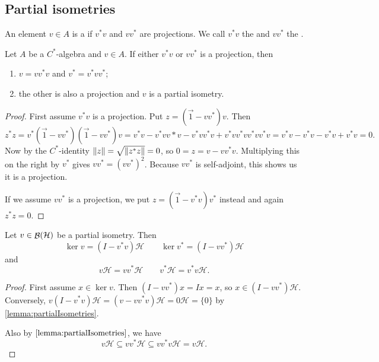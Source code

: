 \subsection{Partial isometries}
\begin{definition}
An element $v\in A$ is a  if $v^*v$ and $vv^*$ are projections. We call $v^*v$ the  and $vv^*$ the .
\end{definition}
\begin{lemma} \label{lemma:partialIsometries}
Let $A$ be a $C^*$-algebra and $v\in A$.
If either $v^*v$ or $vv^*$ is a projection, then
\begin{enumerate}
\item $v=vv^*v$ and $v^* = v^*vv^*$;
\item the other is also a projection and $v$ is a partial isometry.
\end{enumerate}
\end{lemma}
\begin{proof}
First assume $v^*v$ is a projection. Put $z = (\vec{1}- vv^*)v$. Then
\[ z^*z = v^*(\vec{1}-vv^*)(\vec{1}-vv^*)v = v^*v - v^*vv*v -v^*vv^*v + v^*vv^*vv^*vv^*v = v^*v - v^*v - v^*v + v^*v = 0. \]
Now by the $C^*$-identity $\lVert z\rVert = \sqrt{\lVert z^*z\rVert} = 0$, so $0=z= v - vv^*v$. Multiplying this on the right by $v^*$ gives $vv^* = (vv^*)^2$. Because $vv^*$ is self-adjoint, this shows us it is a projection.

If we assume $vv^*$ is a projection, we put $z = (\vec{1}- v^*v)v^*$ instead and again $z^*z = 0$.
\end{proof}

\begin{lemma}
Let $v\in\mathop{\mathcal{B}}(\mathcal{H})$ be a partial isometry. Then
\[\ker v = (I - v^*v)\mathcal{H} \qquad \ker v^* = (I - vv^*)\mathcal{H}\]
and
\[ v\mathcal{H} = vv^*\mathcal{H} \qquad v^*\mathcal{H} = v^*v\mathcal{H}. \]
\end{lemma}
\begin{proof}
First assume $x\in\ker v$. Then $(I-vv^*)x = Ix = x$, so $x\in (I - vv^*)\mathcal{H}$. Conversely, $v(I-v^*v)\mathcal{H} = (v-vv^*v)\mathcal{H} = 0\mathcal{H} = \{0\}$ by \ref{lemma:partialIsometries}.

Also by $\ref{lemma:partialIsometries}$, we have
\[ v\mathcal{H} \subseteq vv^*\mathcal{H} \subseteq vv^*v\mathcal{H} = v\mathcal{H}. \]
\end{proof}


